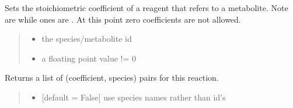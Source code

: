 \documentclass[letterpaper,12pt,english]{sphinxmanual}
\begin{document}
\begin{fulllineitems}
\begin{fulllineitems}
\label{\detokenize{api/core:cbmpy.CBModel.Reaction.setStoichCoefficient}}
\pysigstartsignatures
\pysiglinewithargsret
{}
{\sphinxparamcomma {}}
{}
\pysigstopsignatures
\sphinxAtStartPar
Sets the stoichiometric coefficient of a reagent that refers to a metabolite. Note  are  while  ones are . At this point zero coefficients are not allowed.
\begin{quote}\begin{description}
\begin{itemize}
\item {} 
\sphinxAtStartPar
{} \textendash{} the species/metabolite id

\item {} 
\sphinxAtStartPar
{} \textendash{} a floating point value != 0

\end{itemize}

\end{description}\end{quote}

\end{fulllineitems}


\begin{fulllineitems}
\label{\detokenize{api/core:cbmpy.CBModel.Reaction.getStoichiometry}}
\pysigstartsignatures
\pysiglinewithargsret
{}
{\sphinxparamcomma {}}
{}
\pysigstopsignatures
\sphinxAtStartPar
Returns a list of (coefficient, species) pairs for this reaction.
\begin{quote}\begin{description}
\begin{itemize}
\item {} 
\sphinxAtStartPar
{} \textendash{} {[}default = False{]} use species names rather than id’s


\end{itemize}
\end{description}
\end{quote}
\end{fulllineitems}
\end{fulllineitems}
\end{document}
